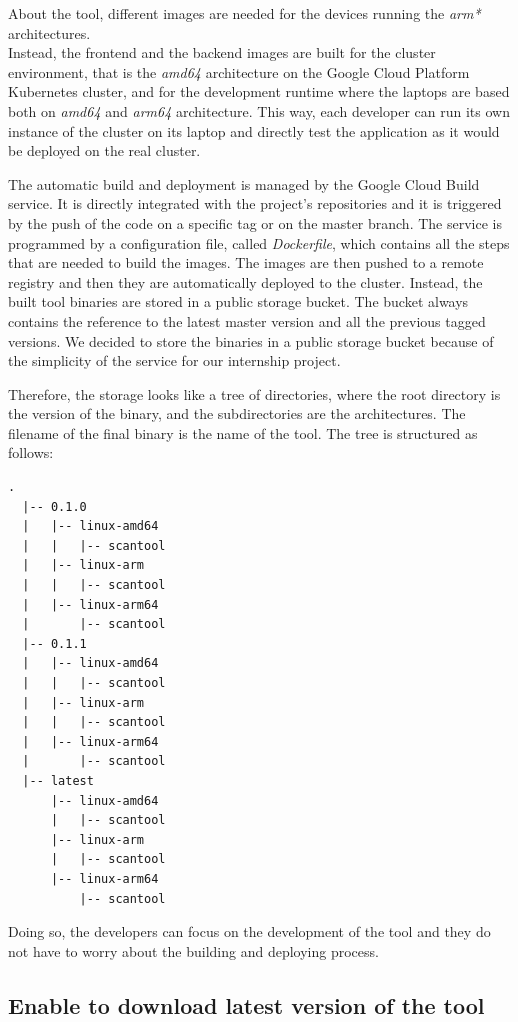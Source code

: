 About the tool, different images are needed for the devices running the \textit{arm*} architectures. \\
Instead, the frontend and the backend images are built for the cluster environment, that is the \textit{amd64} architecture on the Google Cloud Platform Kubernetes cluster, and for the development runtime where the laptops are based both on \textit{amd64} and \textit{arm64} architecture. This way, each developer can run its own instance of the cluster on its laptop and directly test the application as it would be deployed on the real cluster.

The automatic build and deployment is managed by the Google Cloud Build service. It is directly integrated with the project's repositories and it is triggered by the push of the code on a specific tag or on the master branch. The service is programmed by a configuration file, called \textit{Dockerfile}, which contains all the steps that are needed to build the images. The images are then pushed to a remote registry and then they are automatically deployed to the cluster. Instead, the built tool binaries are stored in a public storage bucket. The bucket always contains the reference to the latest master version and all the previous tagged versions. We decided to store the binaries in a public storage bucket because of the simplicity of the service for our internship project.

Therefore, the storage looks like a tree of directories, where the root directory is the version of the binary, and the subdirectories are the architectures. The filename of the final binary is the name of the tool. The tree is structured as follows:

\begin{lstlisting}[caption={Storage bucket tree of directories}]
  .
  |-- 0.1.0
  |   |-- linux-amd64
  |   |   |-- scantool
  |   |-- linux-arm
  |   |   |-- scantool
  |   |-- linux-arm64
  |       |-- scantool
  |-- 0.1.1
  |   |-- linux-amd64
  |   |   |-- scantool
  |   |-- linux-arm
  |   |   |-- scantool
  |   |-- linux-arm64
  |       |-- scantool
  |-- latest
      |-- linux-amd64
      |   |-- scantool
      |-- linux-arm
      |   |-- scantool
      |-- linux-arm64
          |-- scantool
\end{lstlisting}

Doing so, the developers can focus on the development of the tool and they do not have to worry about the building and deploying process.

\subsection{Enable to download latest version of the tool}

